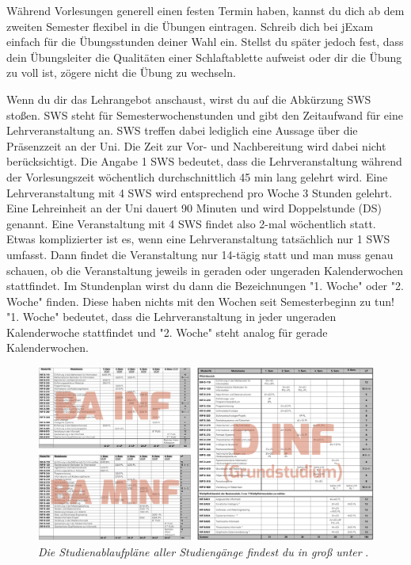Während Vorlesungen generell einen festen Termin haben, kannst du dich ab dem zweiten Semester flexibel in die Übungen eintragen.
Schreib dich bei jExam  einfach für die Übungsstunden deiner Wahl ein.
Stellst du später jedoch fest, dass dein Übungsleiter die Qualitäten einer Schlaftablette aufweist oder dir die Übung zu voll ist, zögere nicht die Übung zu wechseln.

Wenn du dir das Lehrangebot anschaust, wirst du auf die Abkürzung SWS stoßen. SWS steht für Semesterwochenstunden und gibt den Zeitaufwand für eine Lehrveranstaltung an.
SWS treffen dabei lediglich eine Aussage über die Präsenzzeit an der Uni. Die Zeit zur Vor- und Nachbereitung wird dabei nicht berücksichtigt.
Die Angabe 1 SWS bedeutet, dass die Lehrveranstaltung während der Vorlesungszeit wöchentlich durchschnittlich 45 min lang gelehrt wird. Eine Lehrveranstaltung mit 4 SWS wird entsprechend
pro Woche 3 Stunden gelehrt. Eine Lehreinheit an der Uni dauert 90 Minuten und wird Doppelstunde (DS) genannt. Eine Veranstaltung mit 4 SWS findet also 2-mal wöchentlich statt.
Etwas komplizierter ist es, wenn eine Lehrveranstaltung tatsächlich nur 1 SWS umfasst. Dann findet die Veranstaltung nur 14-tägig statt und man muss genau schauen, ob die Veranstaltung jeweils in
geraden oder ungeraden Kalenderwochen stattfindet. Im Stundenplan wirst du dann die Bezeichnungen "1. Woche" oder "2. Woche" finden. Diese haben nichts mit den Wochen seit Semesterbeginn zu tun!
"1. Woche" bedeutet, dass die Lehrveranstaltung in jeder ungeraden Kalenderwoche stattfindet und "2. Woche" steht analog für gerade Kalenderwochen.

\begin{figure}
	\includegraphics[width=\textwidth]{img/alle_studienablaufplaene.png}
	\caption*{\small \textit{Die Studienablaufpläne aller Studiengänge findest du in groß unter} .}
\end{figure}


